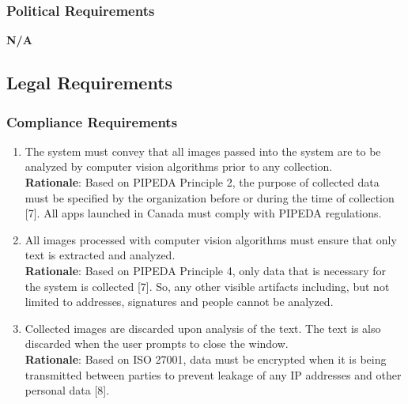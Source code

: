 \subsubsection{Political Requirements}
\label{ssub:political_requirements}
\textbf{N/A}


\subsection{Legal Requirements}
\label{sub:legal_requirements}

\subsubsection{Compliance Requirements}
\label{ssub:compliance_requirements}
\begin{enumerate}[{LR-COMP}1. ]
	\item The system must convey that all images passed into the system are to be analyzed by computer vision algorithms prior to any collection.
	\\ \textbf{Rationale}: Based on PIPEDA Principle 2, the purpose of collected data must be specified by the organization before or during the time of collection [7]. All apps launched in Canada must comply with PIPEDA regulations.
	\item All images processed with computer vision algorithms must ensure that only text is extracted and analyzed.
	\\ \textbf{Rationale}: Based on PIPEDA Principle 4, only data that is necessary for the system is collected [7]. So, any other visible artifacts including, but not limited to addresses, signatures and people cannot be analyzed.
	\item Collected images are discarded upon analysis of the text. The text is also discarded when the user prompts to close the window.
	\\ \textbf{Rationale}: Based on ISO 27001, data must be encrypted when it is being transmitted between parties to prevent leakage of any IP addresses and other personal data [8].
\end{enumerate}

